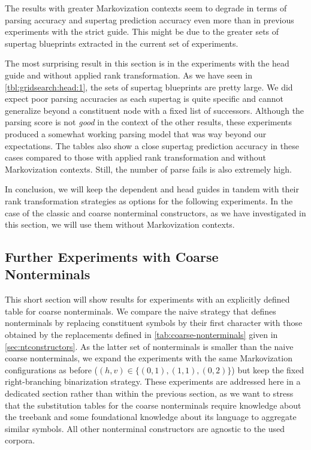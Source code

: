 \documentclass[../../document.tex]{subfiles}
\begin{document}
    The results with greater Markovization contexts seem to degrade in terms of parsing accuracy and supertag prediction accuracy even more than in previous experiments with the strict guide.
    This might be due to the greater sets of supertag blueprints extracted in the current set of experiments.

    The most surprising result in this section is in the experiments with the head guide and without applied rank transformation.
    As we have seen in \cref{tbl:gridsearch:head:1}, the sets of supertag blueprints are pretty large.
    We did expect poor parsing accuracies as each supertag is quite specific and cannot generalize beyond a constituent node with a fixed list of successors.
    Although the parsing score is not \emph{good} in the context of the other results, these experiments produced a somewhat working parsing model that was way beyond our expectations.
    The tables also show a close supertag prediction accuracy in these cases compared to those with applied rank transformation and without Markovization contexts. Still, the number of parse fails is also extremely high.

    In conclusion, we will keep the dependent and head guides in tandem with their rank transformation strategies as options for the following experiments.
    In the case of the classic and coarse nonterminal constructors, as we have investigated in this section, we will use them without Markovization contexts.

    \subsection{Further Experiments with Coarse Nonterminals}\label{sec:gridsearch:coarse}
    This short section will show results for experiments with an explicitly defined table for coarse nonterminals.
    We compare the naive strategy that defines nonterminals by replacing constituent symbols by their first character with those obtained by the replacements defined in \cref{tab:coarse-nonterminals} given in \cref{sec:ntconstructors}.
    As the latter set of nonterminals is smaller than the naive coarse nonterminals, we expand the experiments with the same Markovization configurations as before ($(h,v) \in \{(0,1), (1,1), (0,2)\}$) but keep the fixed right-branching binarization strategy.
    These experiments are addressed here in a dedicated section rather than within the previous section, as we want to stress that the substitution tables for the coarse nonterminals require knowledge about the treebank and some foundational knowledge about its language to aggregate similar symbols.
    All other nonterminal constructors are agnostic to the used corpora.
\end{document}
